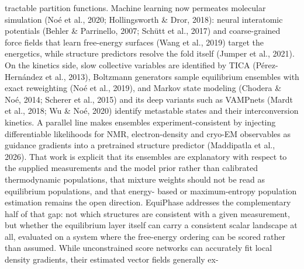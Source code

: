\documentclass{article}
\begin{document}
$$tractable partition functions. Machine learning now permeates molecular simulation (No\'e et al.,
2020; Hollingsworth \& Dror, 2018): neural interatomic potentials (Behler \& Parrinello, 2007; Sch\"utt
et al., 2017) and coarse-grained force fields that learn free-energy surfaces (Wang et al., 2019) target
the energetics, while structure predictors resolve the fold itself (Jumper et al., 2021). On the kinetics
side, slow collective variables are identified by TICA (P\'erez-Hern\'andez et al., 2013), Boltzmann
generators sample equilibrium ensembles with exact reweighting (No\'e et al., 2019), and Markov
state modeling (Chodera \& No\'e, 2014; Scherer et al., 2015) and its deep variants such as VAMPnets
(Mardt et al., 2018; Wu \& No\'e, 2020) identify metastable states and their interconversion kinetics.
A parallel line makes ensembles experiment-consistent by injecting differentiable likelihoods for
NMR, electron-density and cryo-EM observables as guidance gradients into a pretrained structure
predictor (Maddipatla et al., 2026). That work is explicit that its ensembles are explanatory with
respect to the supplied measurements and the model prior rather than calibrated thermodynamic
populations, that mixture weights should not be read as equilibrium populations, and that energy-
based or maximum-entropy population estimation remains the open direction. EquiPhase addresses
the complementary half of that gap: not which structures are consistent with a given measurement,
but whether the equilibrium layer itself can carry a consistent scalar landscape at all, evaluated on
a system where the free-energy ordering can be scored rather than assumed. While unconstrained
score networks can accurately fit local density gradients, their estimated vector fields generally ex-
\clearpage

\end{document}
